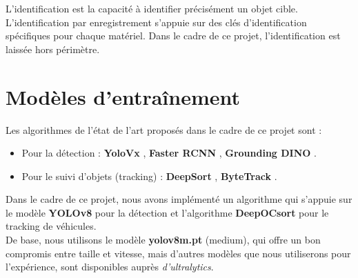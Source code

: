 L'identification est la capacité à identifier précisément un objet cible. L'identification par enregistrement s'appuie sur des clés d'identification spécifiques pour chaque matériel. Dans le cadre de ce projet, l'identification est laissée hors périmètre.


\section{Modèles d'entraînement}

Les algorithmes de l’état de l’art proposés dans le cadre de ce projet sont :

\begin{itemize}
    \item Pour la détection : \textbf{YoloVx} \cite{jocher2023yolo}, \textbf{Faster RCNN} \cite{ren2016faster}, \textbf{Grounding DINO} \cite{liu2023grounding}.
    \item Pour le suivi d’objets (tracking) : \textbf{DeepSort} \cite{wojke2017simple}, \textbf{ByteTrack} \cite{zhang2022bytetrack}.
\end{itemize}

Dans le cadre de ce projet, nous avons implémenté un algorithme qui s’appuie sur le modèle \textbf{YOLOv8} pour la détection et l’algorithme \textbf{DeepOCsort} \cite{maggioolino2023deep} pour le tracking de véhicules.\\

De base, nous utilisons le modèle \textbf{yolov8m.pt} (medium), qui offre un bon compromis entre taille et vitesse, mais d'autres modèles que nous utiliserons pour l'expérience, sont disponibles auprès \textit{d'ultralytics}.

